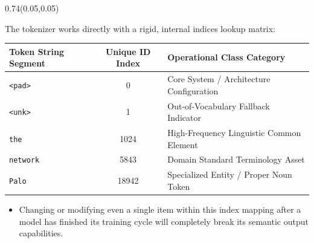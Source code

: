 \documentclass[aspectratio=169]{beamer}
\begin{document}
	\begin{frame}{}
		\setlength{\TPHorizModule}{\textwidth}
		\setlength{\TPVertModule}{\textwidth}
		\begin{textblock}{0.74}(0.05,0.05)
			\bfseries\large{}
		\end{textblock}
		
		\vspace{2em}
		The tokenizer works directly with a rigid, internal indices lookup matrix:
		\vspace{1em}
		\begin{center}
			\small
			\begin{tabular}{|l|c|l|}
				\hline
				\textbf{Token String Segment} & \textbf{Unique ID Index} & \textbf{Operational Class Category} \\
				\hline
				\texttt{<pad>} & 0 & Core System / Architecture Configuration \\
				\texttt{<unk>} & 1 & Out-of-Vocabulary Fallback Indicator \\
				\texttt{the} & 1024 & High-Frequency Linguistic Common Element \\
				\texttt{network} & 5843 & Domain Standard Terminology Asset \\
				\texttt{Palo} & 18942 & Specialized Entity / Proper Noun Token \\
				\hline
			\end{tabular}
		\end{center}
		\vspace{0.5em}
		\begin{itemize}
			\item Changing or modifying even a single item within this index mapping after a model has finished its training cycle will completely break its semantic output capabilities.
		\end{itemize}
	\end{frame}
	
\end{document}
